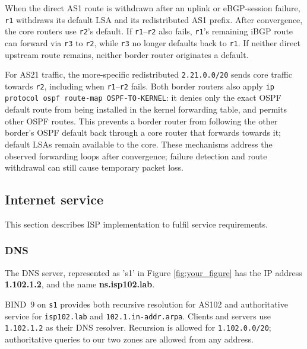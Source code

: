 \documentclass{article}
\begin{document}
When the direct AS1 route is withdrawn after an uplink or eBGP-session failure, \texttt{r1} withdraws its default LSA and its redistributed AS1 prefix. After convergence, the core routers use \texttt{r2}'s default. If \texttt{r1}--\texttt{r2} also fails, \texttt{r1}'s remaining iBGP route can forward via \texttt{r3} to \texttt{r2}, while \texttt{r3} no longer defaults back to \texttt{r1}. If neither direct upstream route remains, neither border router originates a default.

For AS21 traffic, the more-specific redistributed \texttt{2.21.0.0/20} sends core traffic towards \texttt{r2}, including when \texttt{r1}--\texttt{r2} fails. Both border routers also apply \texttt{ip protocol ospf route-map OSPF-TO-KERNEL}: it denies only the exact OSPF default route from being installed in the kernel forwarding table, and permits other OSPF routes. This prevents a border router from following the other border's OSPF default back through a core router that forwards towards it; default LSAs remain available to the core. These mechanisms address the observed forwarding loops after convergence; failure detection and route withdrawal can still cause temporary packet loss.

\subsection{Internet service}
This section describes ISP implementation to fulfil service requirements.


\subsubsection{DNS}


The DNS server, represented as 's1' in Figure \ref{fig:your_figure} has the IP address \textbf{1.102.1.2}, and the name \textbf{ns.isp102.lab}.

BIND~9 on \texttt{s1} provides both recursive resolution for AS102 and authoritative service for \texttt{isp102.lab} and \texttt{102.1.in-addr.arpa}. Clients and servers use \texttt{1.102.1.2} as their DNS resolver. Recursion is allowed for \texttt{1.102.0.0/20}; authoritative queries to our two zones are allowed from any address.
\end{document}
